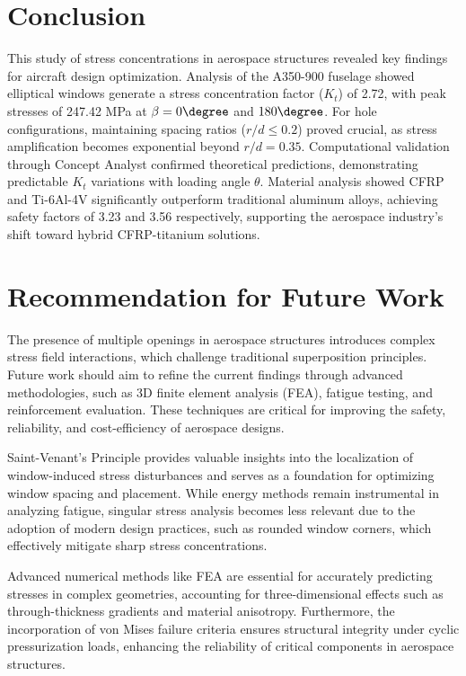 \documentclass[a4paper,11pt]{article}
\begin{document}
\section{Conclusion}
\vspace{-10pt}
This study of stress concentrations in aerospace structures revealed key findings for aircraft design optimization. Analysis of the A350-900 fuselage showed elliptical windows generate a stress concentration factor ($K_t$) of 2.72, with peak stresses of 247.42 MPa at $\beta = 0\degree$ and $180\degree$. For hole configurations, maintaining spacing ratios ($r/d \leq 0.2$) proved crucial, as stress amplification becomes exponential beyond $r/d = 0.35$. Computational validation through Concept Analyst confirmed theoretical predictions, demonstrating predictable $K_t$ variations with loading angle $\theta$. Material analysis showed CFRP and Ti-6Al-4V significantly outperform traditional aluminum alloys, achieving safety factors of 3.23 and 3.56 respectively, supporting the aerospace industry's shift toward hybrid CFRP-titanium solutions.
\vspace{-10pt}
\section{Recommendation for Future Work}
\vspace{-10pt}
The presence of multiple openings in aerospace structures introduces complex stress field interactions, which challenge traditional superposition principles. Future work should aim to refine the current findings through advanced methodologies, such as 3D finite element analysis (FEA), fatigue testing, and reinforcement evaluation. These techniques are critical for improving the safety, reliability, and cost-efficiency of aerospace designs.

Saint-Venant's Principle\cite{saintvenant} provides valuable insights into the localization of window-induced stress disturbances and serves as a foundation for optimizing window spacing and placement. While energy methods\cite{energy_methods} remain instrumental in analyzing fatigue, singular stress analysis\cite{sciencedirect2009} becomes less relevant due to the adoption of modern design practices, such as rounded window corners, which effectively mitigate sharp stress concentrations.

Advanced numerical methods like FEA are essential for accurately predicting stresses in complex geometries, accounting for three-dimensional effects such as through-thickness gradients and material anisotropy. Furthermore, the incorporation of von Mises failure criteria ensures structural integrity under cyclic pressurization loads, enhancing the reliability of critical components in aerospace structures.
\end{document}

